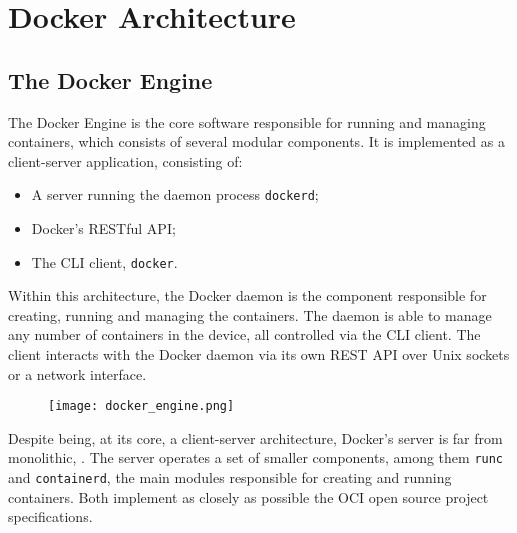 \section{Docker Architecture}
\label{sec::arch}




\subsection{The Docker Engine}
\label{sec::arch:engine}
The Docker Engine is the core software responsible for running and managing containers, which consists of several modular components\cite{Docker-engine}. It is implemented as a client-server application, consisting of:

\begin{itemize}
    \item A server running the daemon process \texttt{dockerd};
    \item Docker's \acs{REST}ful \acs{API};
    \item The \acs{CLI} client, \texttt{docker}.
\end{itemize}

Within this architecture, the Docker daemon is the component responsible for creating, running and managing the containers. The daemon is able to manage any number of containers in the device, all controlled via the \acs{CLI} client. The client interacts with the Docker daemon via its own \acs{REST} \acs{API} over Unix sockets or a network interface\cite{Poulton2020-ju}.

\begin{figure}[!htb]
    \centering
    \texttt{[image: docker\_engine.png]}
    \caption{}
    \label{fig::docker-engine-server}
\end{figure}

Despite being, at its core, a client-server architecture, Docker's server is far from monolithic, . The server operates a set of smaller components, among them \texttt{runc} and \texttt{containerd}, the main modules responsible for creating and running containers. Both implement as closely as possible the OCI open source project specifications\cite{Poulton2020-ju, oci-runc, git-runc, docker-containerd}.

